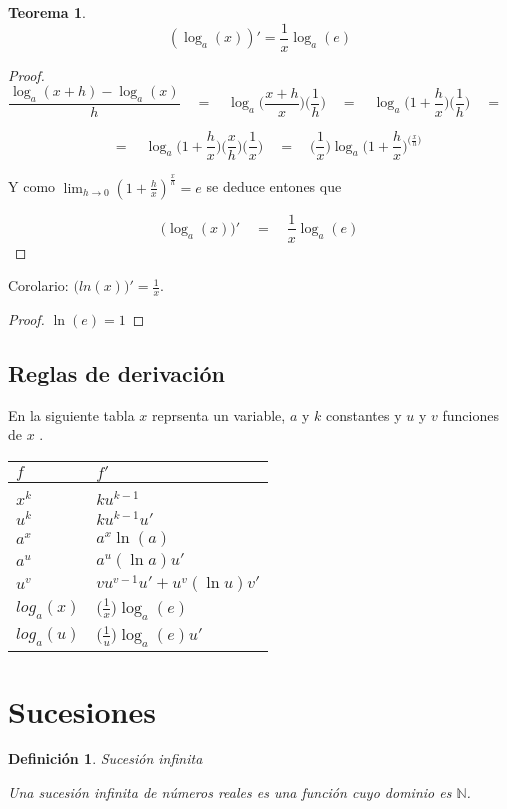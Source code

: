 \documentclass[12pt,a4paper]{article}
\newtheorem{mydef}{Definici\'on}[section]
\newtheorem{theorem}{Teorema}[section]
\begin{document}
\begin{theorem}
\[ (\log_a(x))' = \frac{1}{x}\log_a(e) \]
\end{theorem}
\begin{proof}

\[ \frac{\log_a(x+h)-\log_a(x)}{h} \quad = \quad
\log_a\Big(\frac{x+h}{x}\Big)\Big(\frac{1}{h}\Big) \quad = \quad
\log_a\Big(1+\frac{h}{x}\Big)\Big(\frac{1}{h}\Big) \quad = \quad
 \]


\[  \quad = \quad \log_a\Big(1+\frac{h}{x}\Big)\Big(\frac{x}{h}\Big)\Big(\frac{1}{x}\Big)
 \quad = \quad
 \Big(\frac{1}{x}\Big)\log_a\Big(1+\frac{h}{x}\Big)^{\Big(\frac{x}{h}\Big)} \]

Y como \( \lim_{h \to 0}(1+\frac{h}{x})^{\frac{x}{h}}  =  e \) se
deduce entones que 


\[ \Big(\log_a(x)\Big)' \quad = \quad \frac{1}{x} \log_a(e) \]
\end{proof}
Corolario: \( \Big( ln(x) \Big)' = \frac{1}{x}.  \) 
\begin{proof}
\( \ln(e)=1 \) 
\end{proof}

\subsection{Reglas de derivaci\'on}
En la siguiente tabla \( x \) reprsenta un variable, \( a \) y \( k \) 
constantes y \( u \) y \( v \) funciones de \( x \) .

{\renewcommand{\arraystretch}{1.2} 
\begin{tabular}{l l}
\( f \)  & \( f' \) \\
\hline \\
\( x^k \) & \( ku^{k-1} \)  \\
\( u^k \)  & \( ku^{k-1}u' \)  \\
\( a^x \)  & \( a^x\ln(a) \)  \\
\( a^u \)  & \( a^u(\ln a)u' \)  \\
\( u^v \)  & \( vu^{v-1}u'+u^v(\ln u)v' \)  \\
\( log_a(x) \) & \(  \big(\frac{1}{x}\big)\log_a(e) \) \\
\( log_a(u) \) & \(  \big(\frac{1}{u}\big)\log_a(e)u' \) \\
\end{tabular}
}
\section{Sucesiones}

\begin{mydef}{Sucesi\'on infinita}

Una sucesi\'on infinita de n\'umeros reales es una funci\'on cuyo
dominio es \(\mathbb{N}\).
\end{mydef}
\end{document}
